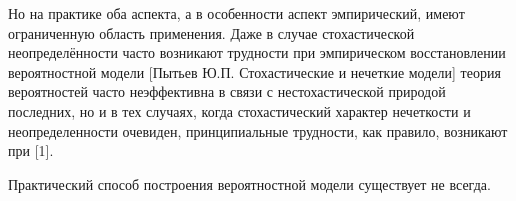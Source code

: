 \begin{comment}
Теория вероятностей как математическая модель феномена случайности может применяться в теоретических и прикладных исследованиях благодаря двум её фундаментальным аспектам:
\begin{enumerate}
  \item математическому: теория вероятности базируется на теории меры и интеграла;
  \item эмпирическому: существуют простые, но математически обоснованные процедуры, позволяющие при определённых условиях
на основе серии наблюдений получить сколь угодно точную аппроксимацию вероятностной модели этих наблюдений, а при 
  при известной вероятностной модели, наоборот,~--- предсказать событийно-частотные результаты наблюдений. 
  \end{itemize}
\end{enumerate}
\end{comment}

Но на практике оба аспекта, а в особенности аспект эмпирический, имеют ограниченную область применения. Даже в случае стохастической неопределённости часто возникают трудности при эмпирическом восстановлении вероятностной модели [Пытьев Ю.П. Стохастические и нечеткие модели]  теория вероятностей часто неэффективна в связи с нестохастической природой последних, но и в тех случаях, когда стохастический характер нечеткости
и неопределенности очевиден, принципиальные трудности, как правило, возникают при
[1].




Практический способ построения вероятностной модели существует не всегда. 


